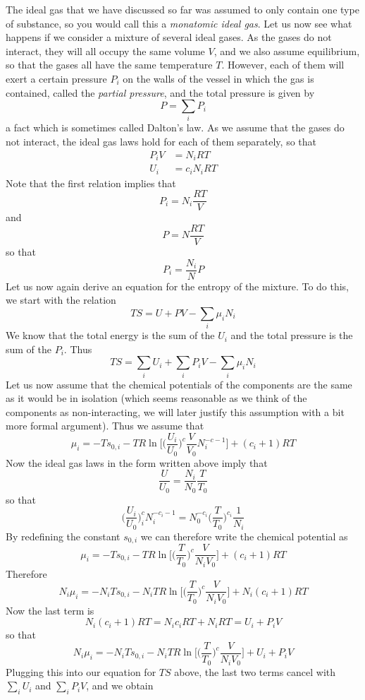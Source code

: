 \documentclass[a4paper, draft]{article}
\theoremstyle{own}
\theoremstyle{remark}
\begin{document}
The ideal gas that we have discussed so far was assumed to only contain one type of substance, so you would call this a {\em monatomic ideal gas}. Let us now see what happens if we consider a mixture of several ideal gases. As the gases do not interact, they will all occupy the same volume $V$, and we also assume equilibrium, so that the gases all have the same temperature $T$. However, each of them will exert a certain pressure $P_i$ on the walls of the vessel in which the gas is contained, called the {\em partial pressure}, and the total pressure is given by
$$
P = \sum_i P_i
$$
a fact which is sometimes called Dalton's law. As we assume that the gases do not interact, the ideal gas laws hold for each of them separately, so that
\begin{align*}
P_i V &= N_i R T \\
U_i &= c_i N_i R T
\end{align*}
Note that the first relation implies that
$$
P_i = N_i \frac{RT}{V} 
$$
and
$$
P = N \frac{RT}{V} 
$$
so that
$$
P_i = \frac{N_i}{N} P
$$
Let us now again derive an equation for the entropy of the mixture. To do this, we start with the relation
$$
TS = U + PV - \sum_i \mu_i N_i
$$
We know that the total energy is the sum of the $U_i$ and the total pressure is the sum of the $P_i$. Thus 
$$
TS = \sum_i U_i + \sum_i P_i V - \sum_i \mu_i N_i
$$
Let us now assume that the chemical potentials of the components are the same as it would be in isolation (which seems reasonable as we think of the components as non-interacting, we will later justify this assumption with a bit more formal argument). Thus we assume that
$$
\mu_i = -T s_{0, i} - T R \ln \big[ \big( \frac{U_i}{U_0} \big)^c \frac{V}{V_0} N_i^{-c - 1}  \big] + (c_i+1) RT
$$
Now the ideal gas laws in the form written above imply that
$$
\frac{U}{U_0} = \frac{N_i}{N_0} \frac{T}{T_0}
$$
so that
$$
\big( \frac{U_i}{U_0} \big)^c_i  N_i^{-c_i - 1} = N_0^{-c_i}  \big(  \frac{T}{T_0} \big)^{c_i} \frac{1}{N_i}
$$
By redefining the constant $s_{0,i}$ we can therefore write the chemical potential as
$$
\mu_i = -T s_{0, i} - T R \ln \big[ \big(  \frac{T}{T_0} \big)^{c} \frac{V}{N_i V_0} \big] + (c_i+1) RT
$$
Therefore
$$
N_i \mu_i = - N_i T s_{0, i} - N_i T R \ln \big[ \big(  \frac{T}{T_0} \big)^{c} \frac{V}{N_i V_0} \big] + N_i (c_i+1) RT
$$
Now the last term is
$$
N_i (c_i+1) RT = N_i c_i R T + N_i R T = U_i + P_i V
$$
so that
$$
N_i \mu_i = - N_i T s_{0, i} - N_i T R \ln \big[ \big(  \frac{T}{T_0} \big)^{c} \frac{V}{N_i V_0} \big] + U_i + P_i V
$$
Plugging this into our equation for $TS$ above, the last two terms cancel with $\sum_i U_i$ and $\sum_i P_i V$, and we obtain
\end{document}

